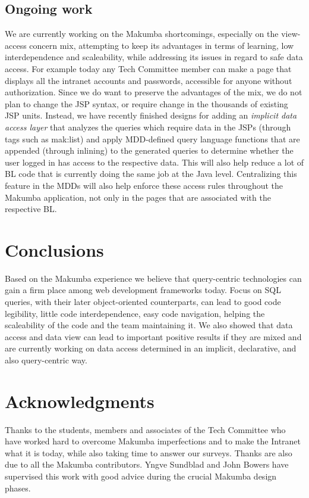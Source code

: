 \documentclass{llncs}
\begin{document}
\subsection{Ongoing work}\label{sec:ongoing}
We are currently working on the Makumba shortcomings, especially on the view-access concern mix, attempting to keep its advantages in terms of learning, low interdependence and scaleability, while addressing its issues in regard to safe data access. For example today any Tech Committee member can make a page that displays all the intranet accounts and passwords, accessible for anyone without authorization. Since we do want to preserve the advantages of the mix, we do not plan to change the JSP syntax, or require change in the thousands of existing JSP units. Instead, we have recently finished designs for adding an \textit{implicit data access layer} that analyzes the queries which require data in the JSPs (through tags such as mak:list) and apply MDD-defined query language functions that are appended (through inlining)  to the generated queries to determine whether the user logged in has access to the respective data. This will also help reduce a lot of  BL code that is currently doing the same job at the Java level. Centralizing this feature in the MDDs will also help enforce these access rules throughout the Makumba application, not only in the pages that are associated with the respective BL.

\section{Conclusions}\label{sec:conclusions}
Based on the Makumba experience we believe that query-centric technologies can gain a firm place among web development frameworks today. Focus on SQL queries, with their later object-oriented counterparts, can lead to good  code legibility, little code interdependence, easy code navigation,  helping the scaleability of the code and the team maintaining it.  We also showed that data access and data view can lead to important positive results if they are mixed and are currently working on data access determined in an implicit, declarative, and also query-centric way. 

\section{Acknowledgments}\label{sec:acknowledgments}
Thanks to the students, members and associates of the Tech Committee who have worked hard to overcome Makumba imperfections and to make the Intranet what it is today, while also taking time to answer our surveys.  Thanks are also due to all the Makumba contributors.  Yngve Sundblad and John Bowers have supervised this work with good advice during the crucial Makumba design phases.



 
\end{document}
